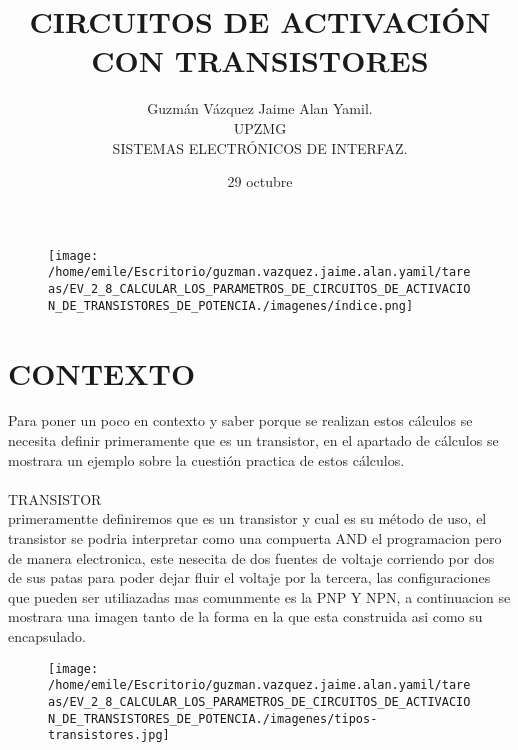 \documentclass[13pt]{article}
\title{\textbf{CIRCUITOS DE ACTIVACIÓN CON TRANSISTORES}}
\author{Guzmán Vázquez Jaime Alan Yamil.\\UPZMG\\SISTEMAS ELECTRÓNICOS DE INTERFAZ.}
\date{29 octubre }
\begin{document}
\begin{figure}[htp]
\centering
\texttt{[image: /home/emile/Escritorio/guzman.vazquez.jaime.alan.yamil/tareas/EV\_2\_8\_CALCULAR\_LOS\_PARAMETROS\_DE\_CIRCUITOS\_DE\_ACTIVACION\_DE\_TRANSISTORES\_DE\_POTENCIA./imagenes/índice.png]}
\caption{}
\label{}
\end{figure}
\maketitle

\section{CONTEXTO}
Para poner un poco en contexto y saber porque se realizan estos cálculos se necesita definir primeramente que es un transistor, en el apartado de cálculos se mostrara un ejemplo sobre la cuestión practica de estos cálculos.\\\\

TRANSISTOR\\
primeramentte definiremos que es un transistor y cual es su método de uso, el transistor se podria interpretar como una compuerta AND el programacion pero de manera electronica, este nesecita de dos fuentes de voltaje corriendo por dos de sus patas para poder dejar fluir el voltaje por la tercera, las configuraciones que pueden ser utiliazadas mas comunmente es la PNP Y NPN, a continuacion se mostrara una imagen tanto de la forma en la que esta construida asi como su encapsulado.\\
\begin{figure}[htp]
\centering
\texttt{[image: /home/emile/Escritorio/guzman.vazquez.jaime.alan.yamil/tareas/EV\_2\_8\_CALCULAR\_LOS\_PARAMETROS\_DE\_CIRCUITOS\_DE\_ACTIVACION\_DE\_TRANSISTORES\_DE\_POTENCIA./imagenes/tipos-transistores.jpg]}
\caption{}
\label{}
\end{figure}\\\\
\end{document}
